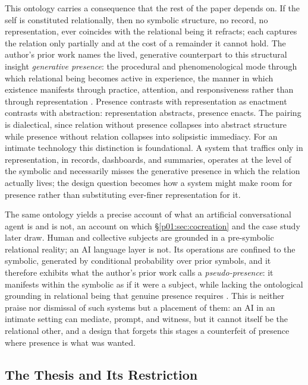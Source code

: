 This ontology carries a consequence that the rest of the paper depends on. If the self is constituted relationally, then no symbolic structure, no record, no representation, ever coincides with the relational being it refracts; each captures the relation only partially and at the cost of a remainder it cannot hold. The author's prior work names the lived, generative counterpart to this structural insight \emph{generative presence}: the procedural and phenomenological mode through which relational being becomes active in experience, the manner in which existence manifests through practice, attention, and responsiveness rather than through representation \parencite{huang2025relational}. Presence contrasts with representation as enactment contrasts with abstraction: representation abstracts, presence enacts. The pairing is dialectical, since relation without presence collapses into abstract structure while presence without relation collapses into solipsistic immediacy. For an intimate technology this distinction is foundational. A system that traffics only in representation, in records, dashboards, and summaries, operates at the level of the symbolic and necessarily misses the generative presence in which the relation actually lives; the design question becomes how a system might make room for presence rather than substituting ever-finer representation for it.

The same ontology yields a precise account of what an artificial conversational agent is and is not, an account on which §\ref{p01:sec:cocreation} and the case study later draw. Human and collective subjects are grounded in a pre-symbolic relational reality; an AI language layer is not. Its operations are confined to the symbolic, generated by conditional probability over prior symbols, and it therefore exhibits what the author's prior work calls a \emph{pseudo-presence}: it manifests within the symbolic as if it were a subject, while lacking the ontological grounding in relational being that genuine presence requires \parencite{huang2025relational}. This is neither praise nor dismissal of such systems but a placement of them: an AI in an intimate setting can mediate, prompt, and witness, but it cannot itself be the relational other, and a design that forgets this stages a counterfeit of presence where presence is what was wanted.

\subsection{The Thesis and Its Restriction}

